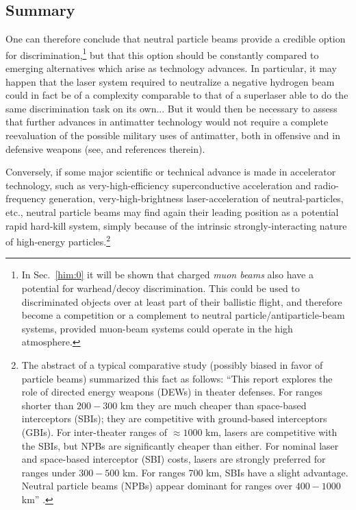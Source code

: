 \documentclass [12pt,a4paper,     ]{report} %
\begin{document}
\subsection{Summary}

One can therefore conclude that neutral particle beams provide a credible option for discrimination,\footnote{In Sec.~\ref{him:0} it will be shown that charged \emph{muon beams} also have a potential for warhead/decoy discrimination.  This could be used to discriminated objects over at least part of their ballistic flight, and therefore become a competition or a complement to neutral particle/antiparticle-beam systems, provided muon-beam systems could operate in the high atmosphere.}  but that this option should be constantly compared to emerging alternatives which arise as technology advances.  In particular, it may happen that the laser system required to neutralize a negative hydrogen beam could in fact be of a complexity comparable to that of a superlaser able to do the same discrimination task on its own...  But it would then be necessary to assess that further advances in antimatter technology would not require a complete reevaluation of the possible military uses of antimatter, both in offensive and in defensive weapons (see, \cite{GSPON1987A,GSPON1988-,THEE-1988-,GSPON1987B} and references therein).

 Conversely, if some major scientific or technical advance is made in accelerator technology, such as very-high-efficiency superconductive acceleration and radio-frequency generation, very-high-brightness laser-acceleration of neutral-particles, etc., neutral particle beams may find again their leading position as a potential rapid hard-kill system, simply because of the intrinsic strongly-interacting nature of high-energy particles.\footnote{The abstract of a typical comparative study (possibly biased in favor of particle beams) summarized this fact as follows: ``This report explores the role of directed energy weapons (DEWs) in theater defenses. For ranges shorter than $200 - 300$ km they are much cheaper than space-based interceptors (SBIs); they are competitive with ground-based interceptors (GBIs). For inter-theater ranges of $\approx 1000$ km, lasers are competitive with the SBIs, but NPBs are significantly cheaper than either. For nominal laser and space-based interceptor (SBI) costs, lasers are strongly preferred for ranges under $300 - 500$ km. For ranges 700 km, SBIs have a slight advantage. Neutral particle beams (NPBs) appear dominant for ranges over $400 - 1000$ km'' \cite{CANAV1991-}.}
\end{document}
